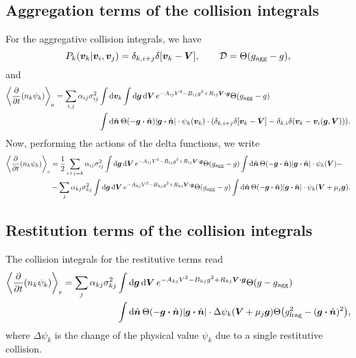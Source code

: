 \documentclass[aps,prl,preprint,groupedaddress,10pt]{revtex4-2}
\begin{document}
\subsection{Aggregation terms of the collision integrals}
For the aggregative collision integrals, we have
\begin{equation}
    P_k(\bv_k\vert\bv_i,\bv_j)=\delta_{k,i+j}\delta\bqty{\bv_k-\bV},\qquad
    \mathcal{D}=\Theta\pqty{\ltx{g}{agg}-g},
\end{equation}
and
\begin{equation}
    \begin{split}
        \avg{\pdv{t}(n_k\psi_k)}_a=\sum_{i,j}\alpha_{ij}\sigma_{ij}^2&\int\dd{\bv_k}\int
        \dd{\bg}\dd{\bV}e^{-A_{ij}V^2-B_{ij}g^2+R_{ij}\bV\vdot\bg}\Theta(\ltx{g}{agg}-g)\\
        &\int\dd{\bn}\Theta\pqty{-\bg\vdot\bn}\abs{\bg\vdot\bn}\cdot\psi_k(\bv_k)\cdot
        \pqty{\delta_{k,i+j}\delta\bqty{\bv_k-\bV}-\delta_{k,i}\delta\pqty{\bv_k-\bv_i(\bg,\bV)}}.
    \end{split}
\end{equation}
Now, performing the actions of the delta functions, we write
\begin{equation}
    \begin{split}
        \avg{\pdv{t}(n_k\psi_k)}_c&=\frac{1}{2}\sum_{i+j=k}\alpha_{ij}\sigma_{ij}^2
        \int\dd{\bg}\dd{\bV}e^{-A_{ij}V^2-B_{ij}g^2+R_{ij}\bV\vdot\bg}\Theta(\ltx{g}{agg}-g)
        \int\dd{\bn}\Theta\pqty{-\bg\vdot\bn}\abs{\bg\vdot\bn}\cdot\psi_k(\bV)-\\
        &-\sum_{j}\alpha_{kj}\sigma_{kj}^2\int\dd{\bg}\dd{\bV}e^{-A_{kj}V^2-B_{kj}g^2+R_{kj}\bV\vdot\bg}
        \Theta(\ltx{g}{agg}-g)\int\dd{\bn}\Theta\pqty{-\bg\vdot\bn}\abs{\bg\vdot\bn}
        \cdot\psi_k(\bV+\mu_j\bg).
    \end{split}
\end{equation}

\subsection{Restitution terms of the collision integrals}
The collision integrals for the restitutive terms read
\begin{equation}
    \begin{split}
        \avg{\pdv{t}(n_k\psi_k)}_r=\sum_{j}\alpha_{kj}\sigma_{kj}^2&\int
        \dd{\bg}\dd{\bV}e^{-A_{kj}V^2-B_{kj}g^2+R_{kj}\bV\vdot\bg}\Theta(g-\ltx{g}{agg})\\
        &\int\dd{\bn}\Theta\pqty{-\bg\vdot\bn}\abs{\bg\vdot\bn}\cdot
        \Delta\psi_k(\bV+\mu_j\bg)\Theta\pqty{\ltx{g}{frag}^2-(\bg\vdot\bn)^2},
    \end{split}
\end{equation}
where $\Delta\psi_k$ is the change of the physical value $\psi_k$ due to a single
restitutive collision.
\end{document}
